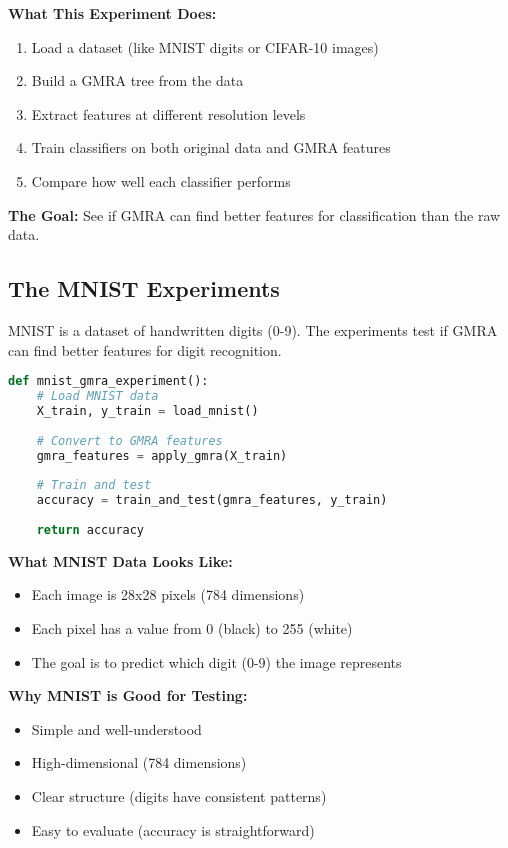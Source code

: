 \documentclass[12pt]{article}
\begin{document}
\textbf{What This Experiment Does:}
\begin{enumerate}
    \item Load a dataset (like MNIST digits or CIFAR-10 images)
    \item Build a GMRA tree from the data
    \item Extract features at different resolution levels
    \item Train classifiers on both original data and GMRA features
    \item Compare how well each classifier performs
\end{enumerate}

\textbf{The Goal:} See if GMRA can find better features for classification than the raw data.

\subsection{The MNIST Experiments}

MNIST is a dataset of handwritten digits (0-9). The experiments test if GMRA can find better features for digit recognition.

\begin{lstlisting}[language=Python, basicstyle=\small]
def mnist_gmra_experiment():
    # Load MNIST data
    X_train, y_train = load_mnist()
    
    # Convert to GMRA features
    gmra_features = apply_gmra(X_train)
    
    # Train and test
    accuracy = train_and_test(gmra_features, y_train)
    
    return accuracy
\end{lstlisting}

\textbf{What MNIST Data Looks Like:}
\begin{itemize}
    \item Each image is 28x28 pixels (784 dimensions)
    \item Each pixel has a value from 0 (black) to 255 (white)
    \item The goal is to predict which digit (0-9) the image represents
\end{itemize}

\textbf{Why MNIST is Good for Testing:}
\begin{itemize}
    \item Simple and well-understood
    \item High-dimensional (784 dimensions)
    \item Clear structure (digits have consistent patterns)
    \item Easy to evaluate (accuracy is straightforward)
\end{itemize}
\end{document}
